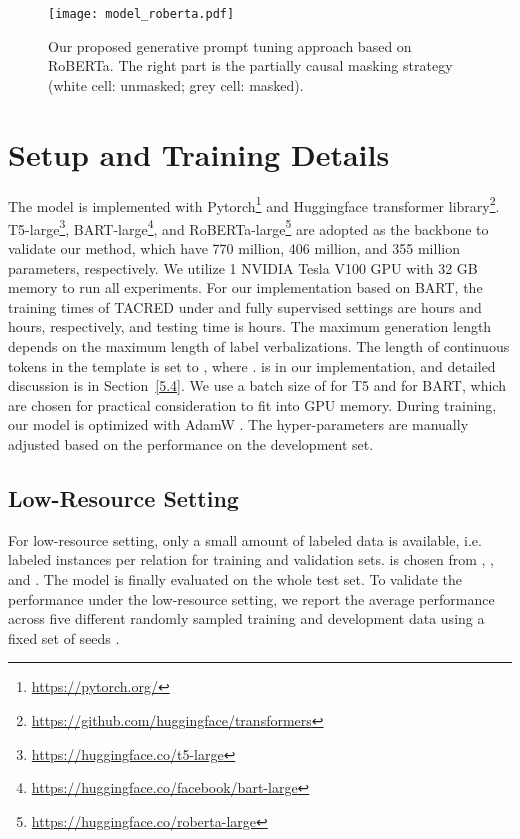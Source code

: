 \documentclass[11pt]{article}
\begin{document}
\begin{figure*}[t]
\centering
	\texttt{[image: model\_roberta.pdf]}
	\caption{Our proposed generative prompt tuning approach based on RoBERTa. The right part is the partially causal masking strategy (white cell: unmasked; grey cell: masked).}
	\label{model_roberta} 
	
\end{figure*}

\section{Setup and Training Details}\label{C}

The model is implemented with Pytorch\footnote{\url{https://pytorch.org/}} and Huggingface transformer library\footnote{\url{https://github.com/huggingface/transformers}}. T5-large\footnote{\url{https://huggingface.co/t5-large}}, BART-large\footnote{\url{https://huggingface.co/facebook/bart-large}}, and RoBERTa-large\footnote{\url{https://huggingface.co/roberta-large}} are adopted as the backbone to validate our method, which have 770 million, 406 million, and 355 million parameters, respectively.  We utilize 1 NVIDIA Tesla V100 GPU with 32 GB memory to run all experiments. For our implementation based on BART, the training times of TACRED under  and fully supervised settings are  hours and  hours, respectively, and testing time is  hours. The maximum generation length  depends on the maximum length of label verbalizations. The length of continuous tokens in the template  is set to , where .  is  in our implementation, and detailed discussion is in Section~\ref{5.4}. We use a batch size of  for T5 and  for BART, which are chosen for practical consideration to fit into GPU memory. During training, our model is optimized with AdamW \cite{DBLP:conf/iclr/LoshchilovH19}. The hyper-parameters are manually adjusted based on the performance on the development set. 

\subsection{Low-Resource Setting}
For low-resource setting, only a small amount of labeled data is available, i.e.  labeled instances per relation for training and validation sets.  is chosen from , , and . The model is finally evaluated on the whole test set. To validate the performance under the low-resource setting, we report the average performance across five different randomly sampled training and development data using a fixed set of seeds .
\end{document}
